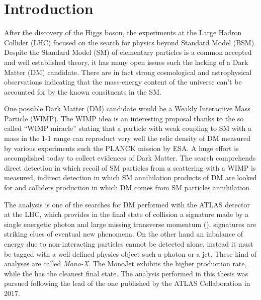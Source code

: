 \chapter{Introduction}
\lettrine{A}{}fter the discovery of the Higgs boson, the experiments at the Large Hadron Collider (LHC) focused on the search for physics beyond Standard Model (BSM). Despite the Standard Model (SM) of elementary particles is a common accepted and well established theory, it has many open issues such the lacking of a Dark Matter (DM) candidate. There are in fact strong cosmological and astrophysical observations indicating that the mass-energy content of the universe can't be accounted for by the known consituents in the SM.
  
One possible Dark Matter (DM) candidate would be a Weakly Interactive Mass Particle (WIMP). The WIMP idea is an interesting proposal thanks to the so called ``WIMP miracle'' stating that a particle with weak coupling to SM with a mass in the \SI{1}{\gev}-\SI{1}{\tev} range can reproduct very well the relic density of DM measured by various experiments such the PLANCK mission by ESA. A huge effort is accomplished today to collect evidences of Dark Matter. The search comprehends direct detection in which recoil of SM particles from a scattering with a WIMP is measured, indirect detection in which SM annihilation products of DM are looked for and colliders production in which DM comes from SM particles annihilation.

The \mph analysis is one of the searches for DM performed with the ATLAS detector at the LHC, which provides in the final state of \pp collision a signature made by a single energetic photon and large missing transverse momentum (\met). \met signatures are striking clues of eventual new phenomena. On the other hand an inbalance of energy due to non-interacting particles cannot be detected alone, instead it must be tagged with a well defined physics object such a photon or a jet. These kind of analyses are called \emph{Mono-X}. The MonoJet exhibits the higher production rate, while the \mph has the cleanest final state. The analysis performed in this thesis was pursued following the lead of the one published by the ATLAS Collaboration in 2017.

